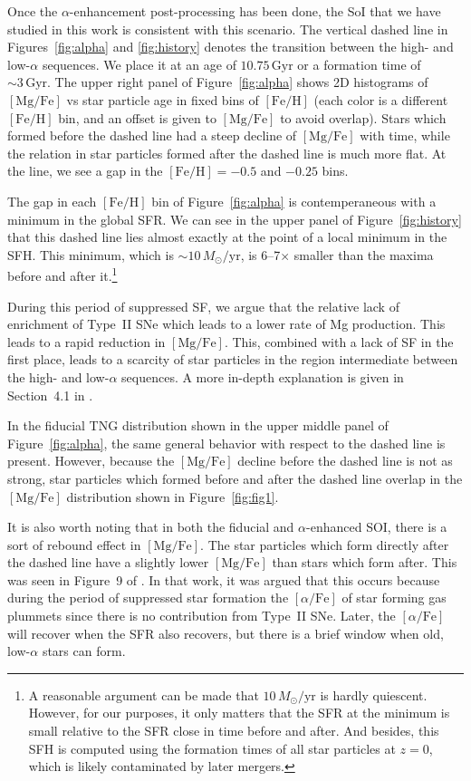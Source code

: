 \documentclass[linenumbers, twocolumn]{aastex631}
\newcommand{\Msun}{\ensuremath{M_{\odot}}}
\newcommand{\Gyr}{\ensuremath{\textrm{Gyr}}}
\newcommand{\FeH}{\ensuremath{[\textrm{Fe}/\textrm{H}]}}
\newcommand{\MgFe}{\ensuremath{[\textrm{Mg}/\textrm{Fe}]}}
\newcommand{\alphaFe}{\ensuremath{[\alpha/\textrm{Fe}]}}
\newcommand{\Msunyr}{\ensuremath{\Msun/\textrm{yr}}}
\begin{document}
Once the $\alpha$-enhancement post-processing has been done, the SoI that we have studied in this work is consistent with this scenario. The vertical dashed line in Figures~\ref{fig:alpha} and \ref{fig:history} denotes the transition between the high- and low-$\alpha$ sequences. We place it at an age of $10.75\,\Gyr$ or a formation time of $\sim3\,\Gyr$. The upper right panel of Figure~\ref{fig:alpha} shows 2D histograms of \MgFe{} vs star particle age in fixed bins of \FeH{} (each color is a different \FeH{} bin, and an offset is given to \MgFe{} to avoid overlap). Stars which formed before the dashed line had a steep decline of \MgFe{} with time, while the relation in star particles formed after the dashed line is much more flat. At the line, we see a gap in the $\FeH=-0.5$ and $-0.25$ bins.

The gap in each \FeH{} bin of Figure~\ref{fig:alpha} is contemperaneous with a minimum in the global SFR. We can see in the upper panel of Figure~\ref{fig:history} that this dashed line lies almost exactly at the point of a local minimum in the SFH. This minimum, which is $\sim10\,\Msunyr$, is 6--7$\times$ smaller than the maxima before and after it.\footnote{A reasonable argument can be made that $10\,\Msunyr$ is hardly quiescent. However, for our purposes, it only matters that the SFR at the minimum is small relative to the SFR close in time before and after. And besides, this SFH is computed using the formation times of all star particles at $z=0$, which is likely contaminated by later mergers.}

During this period of suppressed SF, we argue that the relative lack of enrichment of Type~II SNe which leads to a lower rate of Mg production. This leads to a rapid reduction in \MgFe{}. This, combined with a lack of SF in the first place, leads to a scarcity of star particles in the region intermediate between the high- and low-$\alpha$ sequences. A more in-depth explanation is given in Section~4.1 in \citet{2024arXiv240707985B}. 

In the fiducial TNG distribution shown in the upper middle panel of Figure~\ref{fig:alpha}, the same general behavior with respect to the dashed line is present. However, because the \MgFe{} decline before the dashed line is not as strong, star particles which formed before and after the dashed line overlap in the \MgFe{} distribution shown in Figure~\ref{fig:fig1}. 

It is also worth noting that in both the fiducial and $\alpha$-enhanced SOI, there is a sort of rebound effect in \MgFe{}. The star particles which form directly after the dashed line have a slightly lower \MgFe{} than stars which form after. This was seen in Figure~9 of \citet{2024arXiv240707985B}. In that work, it was argued that this occurs because during the period of suppressed star formation the \alphaFe{} of star forming gas plummets since there is no contribution from Type~II SNe. Later, the \alphaFe{} will recover when the SFR also recovers, but there is a brief window when old, low-$\alpha$ stars can form.
\end{document}
